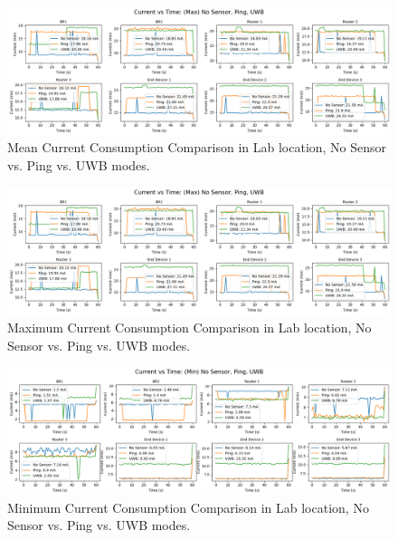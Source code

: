 \begin{figure}[H]
  \includegraphics[width=1\textwidth]{images/research_results/current_consumption_analysis/maximum/lab/max_comparison_no-sensor_vs_ping_vs_uwb.png}
  \caption{Mean Current Consumption Comparison in Lab location, No Sensor vs. Ping vs. UWB modes.}
  \label{fig:mean_comparison_no-sensor_vs_ping_vs_uwb_lab}
\end{figure}

\begin{figure}[H]
  \includegraphics[width=1\textwidth]{images/research_results/current_consumption_analysis/maximum/lab/max_comparison_no-sensor_vs_ping_vs_uwb.png}
  \caption{Maximum Current Consumption Comparison in Lab location, No Sensor vs. Ping vs. UWB modes.}
  \label{fig:max_comparison_no-sensor_vs_ping_vs_uwb_lab}
\end{figure}

\begin{figure}[H]
  \centering
  \includegraphics[width=1\textwidth]{images/research_results/current_consumption_analysis/maximum/lab/min_comparison_no-sensor_vs_ping_vs_uwb.png}
  \caption{Minimum Current Consumption Comparison in Lab location, No Sensor vs. Ping vs. UWB modes.}
  \label{fig:min_comparison_no-sensor_vs_ping_vs_uwb_lab}
\end{figure}

